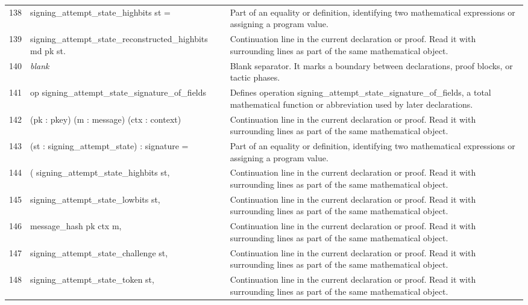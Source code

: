 \documentclass[10pt]{article}
\begin{document}
\begin{longtable}{r L{0.53\textwidth} L{0.37\textwidth}}
138 & {\ttfamily\scriptsize   signing\_attempt\_state\_highbits st =} & Part of an equality or definition, identifying two mathematical expressions or assigning a program value. \\
139 & {\ttfamily\scriptsize     signing\_attempt\_state\_reconstructed\_highbits md pk st.} & Continuation line in the current declaration or proof.  Read it with surrounding lines as part of the same mathematical object. \\
140 & {\ttfamily\scriptsize \emph{blank}} & Blank separator.  It marks a boundary between declarations, proof blocks, or tactic phases. \\
141 & {\ttfamily\scriptsize op signing\_attempt\_state\_signature\_of\_fields} & Defines operation signing\_attempt\_state\_signature\_of\_fields, a total mathematical function or abbreviation used by later declarations. \\
142 & {\ttfamily\scriptsize    (pk : pkey) (m : message) (ctx : context)} & Continuation line in the current declaration or proof.  Read it with surrounding lines as part of the same mathematical object. \\
143 & {\ttfamily\scriptsize    (st : signing\_attempt\_state) : signature =} & Part of an equality or definition, identifying two mathematical expressions or assigning a program value. \\
144 & {\ttfamily\scriptsize   ( signing\_attempt\_state\_highbits st,} & Continuation line in the current declaration or proof.  Read it with surrounding lines as part of the same mathematical object. \\
145 & {\ttfamily\scriptsize     signing\_attempt\_state\_lowbits st,} & Continuation line in the current declaration or proof.  Read it with surrounding lines as part of the same mathematical object. \\
146 & {\ttfamily\scriptsize     message\_hash pk ctx m,} & Continuation line in the current declaration or proof.  Read it with surrounding lines as part of the same mathematical object. \\
147 & {\ttfamily\scriptsize     signing\_attempt\_state\_challenge st,} & Continuation line in the current declaration or proof.  Read it with surrounding lines as part of the same mathematical object. \\
148 & {\ttfamily\scriptsize     signing\_attempt\_state\_token st,} & Continuation line in the current declaration or proof.  Read it with surrounding lines as part of the same mathematical object. \\

\end{longtable}
\end{document}
